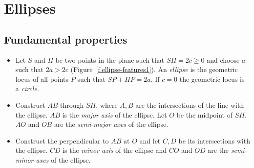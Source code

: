 

\section{Ellipses}\label{s.ellipse}

\subsection{Fundamental properties}

\begin{definition}[Ellipse]
\mbox{}
\begin{itemize}
\item Let $S$ and $H$ be two points in the plane such that $SH=2c\geq 0$ and choose $a$ such that $2a> 2c$ (Figure~\ref{f.ellipse-features1}). An \emph{ellipse} is the geometric locus of all points $P$ such that $SP+HP=2a$. If $c=0$ the geometric locus is a \emph{circle}.
\item Construct $AB$ through $SH$, where $A,B$ are the intersections of the line with the ellipse. $AB$ is  the \emph{major axis} of the ellipse. Let $O$ be the midpoint of $SH$. $AO$ and $OB$ are the \emph{semi-major axes} of the ellipse.
\item Construct the perpendicular to $AB$ at $O$ and let $C,D$ be its intersections with the ellipse. $CD$ is the \emph{minor axis} of the ellipse and $CO$ and $OD$ are the \emph{semi-minor axes} of the ellipse.
\end{itemize}
\end{definition}

\vspace{-3ex}


